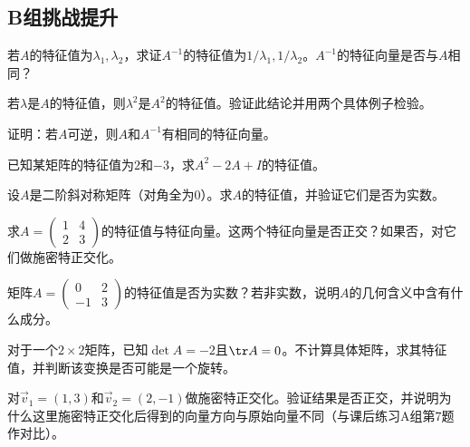 \subsection*{B组\quad 挑战提升}
\begin{exercise}
\item 若$A$的特征值为$\lambda_1,\lambda_2$，求证$A^{-1}$的特征值为$1/\lambda_1,1/\lambda_2$。$A^{-1}$的特征向量是否与$A$相同？
\item 若$\lambda$是$A$的特征值，则$\lambda^2$是$A^2$的特征值。验证此结论并用两个具体例子检验。
\item 证明：若$A$可逆，则$A$和$A^{-1}$有相同的特征向量。
\item 已知某矩阵的特征值为$2$和$-3$，求$A^2-2A+I$的特征值。
\item 设$A$是二阶斜对称矩阵（对角全为$0$）。求$A$的特征值，并验证它们是否为实数。
\item 求$A=\begin{pmatrix}1&4\\2&3\end{pmatrix}$的特征值与特征向量。这两个特征向量是否正交？如果否，对它们做施密特正交化。
\item 矩阵$A=\begin{pmatrix}0&2\\-1&3\end{pmatrix}$的特征值是否为实数？若非实数，说明$A$的几何含义中含有什么成分。
\item 对于一个$2\times2$矩阵，已知$\det A=-2$且$\tr A=0$。不计算具体矩阵，求其特征值，并判断该变换是否可能是一个旋转。
\item 对$\vec v_1=(1,3)$和$\vec v_2=(2,-1)$做施密特正交化。验证结果是否正交，并说明为什么这里施密特正交化后得到的向量方向与原始向量不同（与课后练习A组第7题作对比）。
\end{exercise}

\newpage

